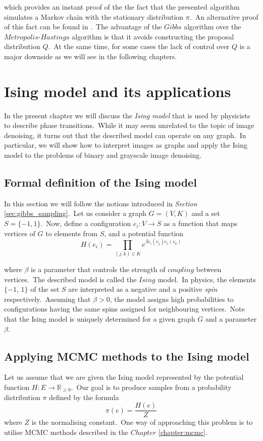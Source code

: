 \documentclass[shortabstract, english, lic]{iithesis}
\newcommand\numberedchapter[1]{\setlength\topskip{3cm}\chapter{#1}\setlength\topskip{0cm}}
\theoremstyle{default_theorem_style}\newtheorem{theorem}{Theorem}
\theoremstyle{default_theorem_style}\newtheorem{definition}{Definition}
\begin{document}
\noindent which provides an instant proof of the the fact that the presented algorithm simulates a Markov chain with the
stationary distribution $\pi$.\ An alternative proof of this fact can be found in \cite{mcmc_book}.\ The advantage of
the $Gibbs$ algorithm over the $Metropolis$-$Hastings$ algorithm is that it avoids constructing  the proposal
distribution $Q$.\ At the same time, for some cases the lack of control over $Q$ is a major downside as we will see
in the following chapters.

\numberedchapter{Ising model and its applications}\label{chapter:ising_model}

\noindent In the present chapter we will discuss the \textit{Ising model} that is used by physicists to describe phase
transitions.\ While it may seem unrelated to the topic of image denoising, it turns out that the described model
can operate on any graph.\ In particular, we will show how to interpret images as graphs and apply the Ising model to
the problems of binary and grayscale image denoising.

\section{Formal definition of the Ising model}

In this section we will follow the notions introduced in \textit{Section} \ref{sec:gibbs_sampling}.\ Let us consider
a graph $G = (V, K)$ and a set $S = \{-1, 1\}$.\ Now, define a configuration $e_i : V \to S$ as a function that
maps vertices of $G$ to elements from $S$, and a potential function
$$
H(e_i) = \prod\limits_{(j, k) \in K} e^{\beta e_i(v_j)e_i(v_k)}
$$

\noindent where $\beta$ is a parameter that controls the strength of $coupling$ between vertices.\ The described model
is called the $Ising$ model.\ In physics, the elements $\{-1, \, 1\}$ of the set $S$ are interpreted as a negative and a
positive \textit{spin} respectively.\ Assuming that $\beta > 0$, the model assigns high probabilities to configurations
having the same spins assigned for neighbouring vertices.\ Note that the Ising model is uniquely determined for
a given graph $G$ and a parameter $\beta$.

\section{Applying MCMC methods to the Ising model}

Let us assume that we are given the Ising model represented by the potential function
$H : E \to \mathbb R_{\geq 0}$.\ Our goal is to produce samples from a probability distribution $\pi$ defined by
the formula
$$
\pi(e) = \frac{H(e)}{Z}
$$
where $Z$ is the normalising constant.\ One way of approaching this problem is to utilise MCMC methods described in
the $Chapter$ \ref{chapter:mcmc}.\newline
\end{document}
